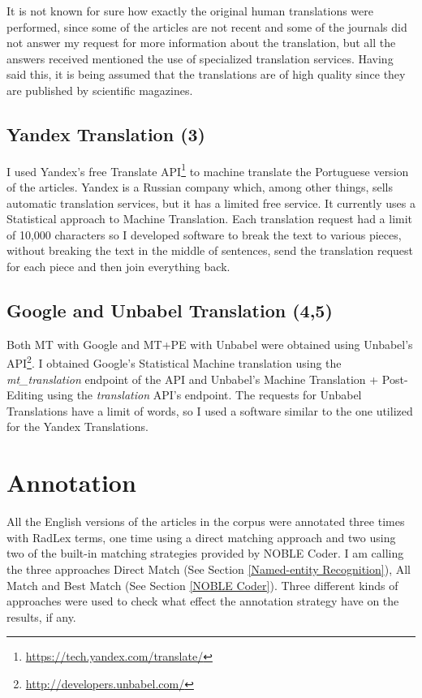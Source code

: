 It is not known for sure how exactly the original human translations were performed, since some of the articles are not recent and some of the journals did not answer my request for more information about the translation, but all the answers received mentioned the use of specialized translation services. Having said this, it is being assumed that the translations are of high quality since they are published by scientific magazines. 

\subsection{Yandex Translation (3)}

I used Yandex's free Translate API\footnote{\url{https://tech.yandex.com/translate/}} to machine translate the Portuguese version of the articles. Yandex is a Russian company which, among other things, sells automatic translation services, but it has a limited free service. It currently uses a Statistical approach to Machine Translation. Each translation request had a limit of 10,000 characters so I developed software to break the text to various pieces, without breaking the text in the middle of sentences, send the translation request for each piece and then join everything back. 

\subsection{Google and Unbabel Translation (4,5)}

Both MT with Google and MT+PE with Unbabel were obtained using Unbabel's API\footnote{\url{http://developers.unbabel.com/}}. I obtained Google’s Statistical Machine translation using the \textit{mt\_translation} endpoint of the API and Unbabel’s Machine Translation + Post-Editing using the \textit{translation} API’s endpoint.  The requests for Unbabel Translations have a limit of words, so I used a software similar to the one utilized for the Yandex Translations. 

\section{Annotation}

All the English versions of the articles in the corpus were annotated three times with RadLex terms, one time using a direct matching approach and two using two of the built-in matching strategies provided by NOBLE Coder. I am calling the three approaches Direct Match (See Section \ref{Named-entity Recognition}), All Match and Best Match (See Section \ref{NOBLE Coder}). Three different kinds of approaches were used to check what effect the annotation strategy have on the results, if any.

